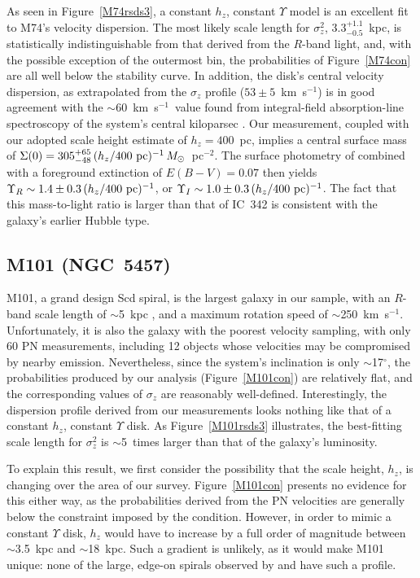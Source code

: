 \documentclass[12pt,preprint]{emulateapj}
\newcommand{\kms}{km~s$^{-1}$}
\begin{document}
As seen in Figure~\ref{M74rsds3}, a constant $h_z$, constant $\Upsilon$ model is an excellent fit to M74's velocity dispersion.   The most likely scale length for $\sigma_z^2$, $3.3^{+1.1}_{-0.5}$~kpc, is statistically indistinguishable from that derived from the $R$-band light, and, with the possible exception of the outermost bin, the probabilities of Figure~\ref{M74con} are all well below the \citet{t64} stability curve.  In addition, the disk's central velocity dispersion, as extrapolated from the $\sigma_z$ profile ($53 \pm 5$~\kms) is in good agreement with the $\sim$60~\kms\ value found from integral-field absorption-line spectroscopy of the system's central kiloparsec \citep{g+06}.  Our measurement, coupled with our adopted scale height estimate of $h_z = 400$~pc, implies a central surface mass of $\Sigma(0) = 305^{+65}_{-48} \, (h_z / 400~{\rm pc})^{-1} \, M_{\odot}$~pc$^{-2}$.  The surface photometry of \citet{m04} combined with a foreground extinction of $E(B-V) = 0.07$ \citep{sfd98} then yields $\Upsilon_R \sim 1.4 \pm 0.3 \, (h_z / 400~{\rm pc})^{-1}$, or $\Upsilon_I \sim 1.0 \pm 0.3 \, (h_z / 400~{\rm pc})^{-1}$.  The fact that this mass-to-light ratio is larger than that of IC~342 is consistent with the galaxy's earlier Hubble type.

\subsection{M101 (NGC~5457)}
M101, a grand design Scd spiral, is the largest galaxy in our sample, with an $R$-band scale length of $\sim$5~kpc \citep{khc06}, and a maximum rotation speed of $\sim$250~\kms.  Unfortunately, it is also the galaxy with the poorest velocity sampling, with only 60 PN measurements, including 12 objects whose velocities may be compromised by nearby emission.  Nevertheless, since the system's inclination is only $\sim$17$^\circ$, the probabilities produced by our analysis (Figure~\ref{M101con}) are relatively flat, and the corresponding values of $\sigma_z$ are reasonably well-defined.  Interestingly, the dispersion profile derived from our measurements looks nothing like that of a constant $h_z$, constant $\Upsilon$ disk.  As Figure~\ref{M101rsds3} illustrates, the best-fitting scale length for $\sigma_z^2$ is $\sim$5~times larger than that of the galaxy's luminosity.

To explain this result, we first consider the possibility that the scale height, $h_z$, is changing over the area of our survey.  Figure~\ref{M101con} presents no evidence for this either way, as the probabilities derived from the PN velocities are generally below the constraint imposed by the \citet{t64} condition.   However, in order to mimic a constant $\Upsilon$ disk, $h_z$ would have to increase by a full order of magnitude between $\sim$3.5~kpc and $\sim$18~kpc.  Such a gradient is unlikely, as it would make M101 unique:  none of the large, edge-on spirals observed by \citet{vdKs82} and \citet{bm02} have such a profile.
\end{document}
